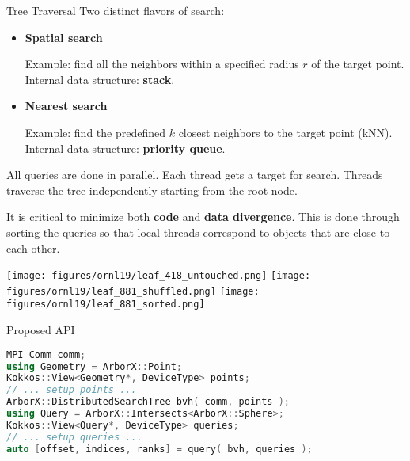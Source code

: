 \documentclass[final,hyperref={pdfpagelabels=false}]{beamer}
\begin{document}
\begin{frame}[t,fragile]
\begin{columns}[t]
\begin{column}{.480\textwidth}
\begin{block}{\centering Tree Traversal}
  Two distinct flavors of search:

  \begin{itemize}
    \item \textbf{Spatial search}

      Example: find all the neighbors within a specified radius $r$ of the target point.
      Internal data structure: \textbf{stack}.

    \item \textbf{Nearest search}

      Example: find the predefined $k$ closest neighbors to the target point
      (kNN).
      Internal data structure: \textbf{priority queue}.

  \end{itemize}

  All queries are done in parallel. Each thread gets a target for search.
  Threads traverse the tree independently starting from the root
  node.

  It is critical to minimize both \textbf{code} and \textbf{data divergence}.
  This is done through sorting the queries so that local threads correspond to
  objects that are close to each other.

\begin{center}
  \texttt{[image: figures/ornl19/leaf\_418\_untouched.png]}
  \texttt{[image: figures/ornl19/leaf\_881\_shuffled.png]}
  \texttt{[image: figures/ornl19/leaf\_881\_sorted.png]}
\end{center}

\end{block}

\begin{block}{\centering Proposed API}

\begin{lstlisting}[language=C++]
MPI_Comm comm;
using Geometry = ArborX::Point;
Kokkos::View<Geometry*, DeviceType> points;
// ... setup points ...
ArborX::DistributedSearchTree bvh( comm, points );
using Query = ArborX::Intersects<ArborX::Sphere>;
Kokkos::View<Query*, DeviceType> queries;
// ... setup queries ...
auto [offset, indices, ranks] = query( bvh, queries );
\end{lstlisting}


\end{block}
\end{column}
\end{columns}
\end{frame}
\end{document}
